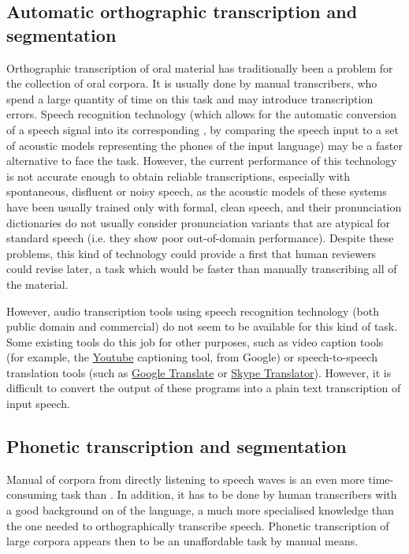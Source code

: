 \documentclass[output=paper]{langsci/langscibook}
\begin{document}
\subsection{Automatic orthographic transcription and segmentation}

Orthographic transcription of oral material has traditionally been a problem for the collection of oral corpora. It is usually done by manual transcribers, who spend a large quantity of time on this task and may introduce transcription errors. Speech recognition technology (which allows for the automatic conversion of a speech signal into its corresponding , by comparing the speech input to a set of acoustic models representing the phones of the input language) may be a faster alternative to face the task. However, the current performance of this technology is not accurate enough to obtain reliable transcriptions, especially with spontaneous, disfluent or noisy speech, as the acoustic models of these systems have been usually trained only with formal, clean speech, and their pronunciation dictionaries do not usually consider pronunciation variants that are atypical for standard speech (i.e. they show poor out-of-domain performance). Despite these problems, this kind of technology could provide a first  that human reviewers could revise later, a task which would be faster than manually transcribing all of the material.

However, audio transcription tools using speech recognition technology (both public domain and commercial) do not seem to be available for this kind of task. Some existing tools do this job for other purposes, such as video caption tools (for example, the \href{https://support.google.com/youtube/answer/3038280?hl=en}{Youtube} captioning tool, from Google) or speech-to-speech translation tools (such as \href{https://support.google.com/translate/answer/6142468?hl=en}{Google Translate} or \href{http://www.skype.com/en/translator-preview/}{Skype Translator}). However, it is difficult to convert the output of these programs into a plain text transcription of input speech.

\subsection{Phonetic transcription and segmentation}

Manual  of corpora from directly listening to speech waves is an even more time-consuming task than . In addition, it has to be done by human transcribers with a good background on  of the language, a much more specialised knowledge than the one needed to orthographically transcribe speech. Phonetic transcription of large corpora appears then to be an unaffordable task by manual means.
\end{document}
